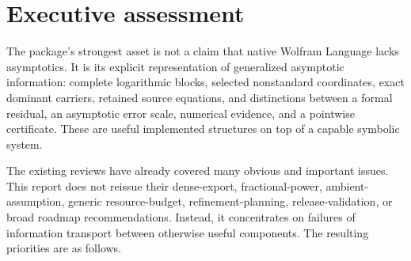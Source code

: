 \documentclass[11pt,a4paper]{article}
\newcommand{\code}[1]{\texttt{\detokenize{#1}}}
\begin{document}
\begin{abstract}
This is an incremental review of the Asymptotic repository, deliberately avoiding a new presentation of the findings already consolidated under its \code{code-review} directory. It compares implemented capabilities with current official Wolfram Language documentation, examines the ordinary and specialized expansion machinery and its operational contracts, and develops five additional findings. The strongest correctness result is a source-traced fixed-parameter capture counterexample in ordinary series composition. A second exact analysis shows that directed dyadic rounding can prevent certification of a translated linear equation at every permitted enclosure order, even when an exact root center is supplied. A related numerical-conditioning analysis explains why the ordinary inverse checker should compute in a local source coordinate. The remaining findings concern an inherited but unconsumed Fourier term-goal option and the disappearance of quantitative Zeta/Lerch tail bounds under ordinary truncation. Each finding includes its relation to the prior-review baseline, reproducible evidence, limitations, a proposed remedy, and acceptance criteria. The accompanying code separates executed independent checks from unexecuted native regression candidates and does not modify the repository.
\end{abstract}
\tableofcontents
\clearpage

\section{Executive assessment}

The package's strongest asset is not a claim that native Wolfram Language lacks asymptotics. It is its explicit representation of generalized asymptotic information: complete logarithmic blocks, selected nonstandard coordinates, exact dominant carriers, retained source equations, and distinctions between a formal residual, an asymptotic error scale, numerical evidence, and a pointwise certificate. These are useful implemented structures on top of a capable symbolic system.\cite{readme,core,operations,certificates,gamma}

The existing reviews have already covered many obvious and important issues. This report does not reissue their dense-export, fractional-power, ambient-assumption, generic resource-budget, refinement-planning, release-validation, or broad roadmap recommendations. Instead, it concentrates on failures of information transport between otherwise useful components. The resulting priorities are as follows.
\end{document}
